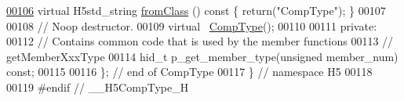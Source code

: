\begin{DoxyCode}
\hyperlink{class_h5_1_1_comp_type_a2413f08e41c809f5cc1a9f3ea9fe32fd}{00106}         \textcolor{keyword}{virtual} H5std\_string \hyperlink{class_h5_1_1_comp_type_a2413f08e41c809f5cc1a9f3ea9fe32fd}{fromClass} ()\textcolor{keyword}{ const }\{ \textcolor{keywordflow}{return}(\textcolor{stringliteral}{"CompType"}); \}
00107 
00108         \textcolor{comment}{// Noop destructor.}
00109         \textcolor{keyword}{virtual} ~\hyperlink{class_h5_1_1_comp_type}{CompType}();
00110 
00111    \textcolor{keyword}{private}:
00112         \textcolor{comment}{// Contains common code that is used by the member functions}
00113         \textcolor{comment}{// getMemberXxxType}
00114         hid\_t p\_get\_member\_type(\textcolor{keywordtype}{unsigned} member\_num) \textcolor{keyword}{const};
00115 
00116 \}; \textcolor{comment}{// end of CompType}
00117 \} \textcolor{comment}{// namespace H5}
00118 
00119 \textcolor{preprocessor}{#endif // \_\_H5CompType\_H}
\end{DoxyCode}
